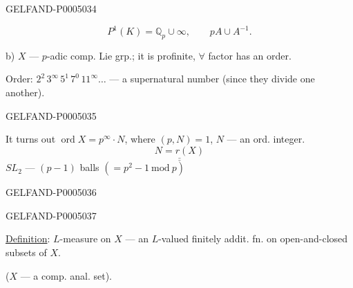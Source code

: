 \begin{GelfandAdjacentEvidence}{GELFAND-P000503}{4}

\[
P^1(K)=\mathbb Q_p\cup\infty,\qquad pA\cup A^{-1}.
\]

b) $X$ — $p$-adic comp. Lie grp.; it is profinite, $\forall$ factor has an order.

Order: $2^2\,3^\infty\,5^1\,7^0\,11^\infty\ldots$ —
a supernatural number (since they divide one another).
\end{GelfandAdjacentEvidence}
\begin{GelfandAdjacentEvidence}{GELFAND-P000503}{5}


It turns out $\operatorname{ord}X=p^\infty\cdot N$,
where $(p,N)=1$, $N$ — an ord. integer.
\[
\underline{\underline{N=r(X)}}
\]
$SL_2$ — $(p-1)$ balls $(=p^2-1\ \mathrm{mod}\ p)$
\end{GelfandAdjacentEvidence}
\begin{GelfandAdjacentEvidence}{GELFAND-P000503}{6}


\end{GelfandAdjacentEvidence}
\begin{GelfandAdjacentEvidence}{GELFAND-P000503}{7}

\uline{Definition}: $L$-measure on $X$ — an $L$-valued finitely addit. fn. on open-and-closed subsets of $X$.

($X$ — a comp. anal. set).
\end{GelfandAdjacentEvidence}
